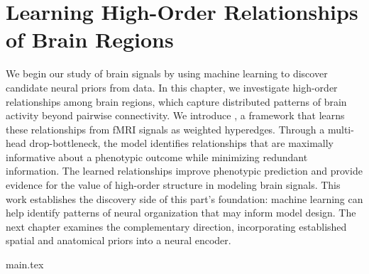 




\chapter{Learning High-Order Relationships of Brain Regions}

We begin our study of brain signals by using machine learning to discover candidate neural priors from data. In this chapter, we investigate high-order relationships among brain regions, which capture distributed patterns of brain activity beyond pairwise connectivity. We introduce \hybrid{}, a framework that learns these relationships from fMRI signals as weighted hyperedges. Through a multi-head drop-bottleneck, the model identifies relationships that are maximally informative about a phenotypic outcome while minimizing redundant information. The learned relationships improve phenotypic prediction and provide evidence for the value of high-order structure in modeling brain signals. This work establishes the discovery side of this part's foundation: machine learning can help identify patterns of neural organization that may inform model design. The next chapter examines the complementary direction, incorporating established spatial and anatomical priors into a neural encoder.




{main.tex}
